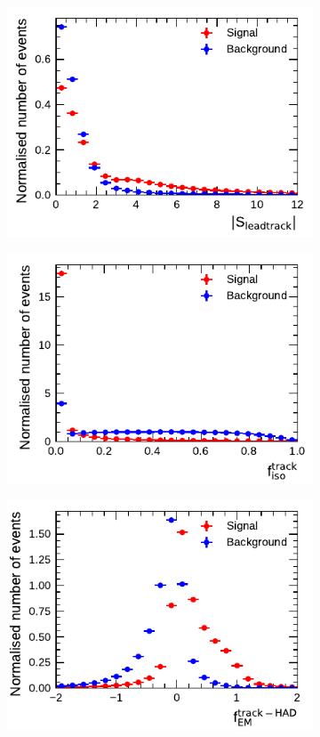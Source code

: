 \begin{figure}[!ht]
\begin{subfigure}{0.5\textwidth}
  \end{subfigure}%
  \begin{subfigure}{0.5\textwidth}
    \centering
    \includegraphics{./figures/baseline_bdt_vars/1p/absipSigLeadTrk.pdf}
  \end{subfigure}
  \begin{subfigure}{0.5\textwidth}
    \centering
    \includegraphics{./figures/baseline_bdt_vars/1p/SumPtTrkFrac.pdf}
  \end{subfigure}%
  \begin{subfigure}{0.5\textwidth}
    \centering
    \includegraphics{./figures/baseline_bdt_vars/1p/ChPiEMEOverCaloEME.pdf}

\end{subfigure}
\end{figure}
